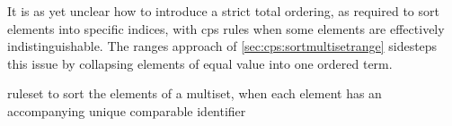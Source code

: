 It is as yet unclear how to introduce a strict total ordering, as required to sort elements into specific indices, with \gls{cps} rules when some elements are effectively indistinguishable.  The ranges approach of \cref{sec:cps:sortmultisetrange} sidesteps this issue by collapsing elements of equal value into one ordered term.


\begin{cprulesetfloat} \begin{cpruleset}


\end{cpruleset}
\caption{\label{rules:cps:sortmultisetid}\Gls{ruleset} to sort the elements of a multiset, when each element has an accompanying unique comparable identifier}
\end{cprulesetfloat}

